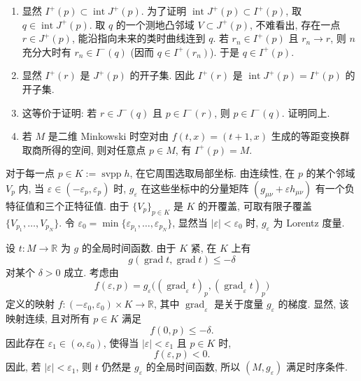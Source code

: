 \begin{description}[font=\normalfont,leftmargin=2em,labelwidth=1.5em]
\begin{enumerate}[label=(\alph*),ref=\alph*,leftmargin=*]
\begin{align*}
\end{align*}
所以, 对于充分小的正数 $s$, $\gamma(s,t)$ 为指向未来的类时曲线. 因此
\[
  q=\lim_{s\to0^+}\gamma(s,1)\in\overline{I^+(p)}.
\]
\item 显然 $I^+(p)\subset\operatorname{int}J^+(p)$. 为了证明 $\operatorname{int}J^+(p)\subset I^+(p)$, 取 $q\in\operatorname{int}J^+(p)$. 取 $q$ 的一个测地凸邻域 $V\subset J^+(p)$, 不难看出, 存在一点 $r\in J^+(p)$, 能沿指向未来的类时曲线连到 $q$. 若 $r_n\in I^+(p)$ 且 $r_n\to r$, 则 $n$ 充分大时有 $r_n\in I^-(q)$ (因而 $q\in I^+(r_n)$). 于是 $q\in I^+(p)$.
\item 显然 $I^+(r)$ 是 $J^+(p)$ 的开子集. 因此 $I^+(r)$ 是 $\operatorname{int}J^+(p)=I^+(p)$ 的开子集.
\item 这等价于证明: 若 $r\in J^-(q)$ 且 $p\in I^-(r)$, 则 $p\in I^-(q)$. 证明同上.
\item 若 $M$ 是二维 Minkowski 时空对由 $f(t,x)=(t+1,x)$ 生成的等距变换群取商所得的空间, 则对任意点 $p\in M$, 有 $I^+(p)=M$.
\end{enumerate}

对于每一点 $p\in K:=\operatorname{svpp}h$, 在它周围选取局部坐标. 由连续性, 在 $p$ 的某个邻域 $V_p$ 内, 当 $\varepsilon\in(-\varepsilon_p,\varepsilon_p)$ 时, $g_\varepsilon$ 在这些坐标中的分量矩阵 $(g_{\mu\nu}+\varepsilon h_{\mu\nu})$ 有一个负特征值和三个正特征值. 由于 $\{V_p\}_{p\in K}$ 是 $K$ 的开覆盖, 可取有限子覆盖 $\{V_{p_1},\ldots,V_{p_N}\}$. 令 $\varepsilon_0=\min\{\varepsilon_{p_1},\ldots,\varepsilon_{p_N}\}$, 显然当 $|\varepsilon|<\varepsilon_0$ 时, $g_\varepsilon$ 为 Lorentz 度量.

设 $t:M\to\mathbb{R}$ 为 $g$ 的全局时间函数. 由于 $K$ 紧, 在 $K$ 上有
\[
  g(\operatorname{grad}t,\operatorname{grad}t)\leq-\delta
\]
对某个 $\delta>0$ 成立. 考虑由
\[
  f(\varepsilon,p)=g_\varepsilon\bigl((\operatorname{grad}_\varepsilon t)_p,
                                    (\operatorname{grad}_\varepsilon t)_p\bigr)
\]
定义的映射 $f:(-\varepsilon_0,\varepsilon_0)\times K\to\mathbb{R}$, 其中 $\operatorname{grad}_\varepsilon$ 是关于度量 $g_\varepsilon$ 的梯度. 显然, 该映射连续, 且对所有 $p\in K$ 满足
\[
  f(0,p)\leq-\delta.
\]
因此存在 $\varepsilon_1\in(o,\varepsilon_0)$, 使得当 $|\varepsilon|<\varepsilon_1$ 且 $p\in K$ 时,
\[
  f(\varepsilon,p)<0.
\]
因此, 若 $|\varepsilon|<\varepsilon_1$, 则 $t$ 仍然是 $g_\varepsilon$ 的全局时间函数, 所以 $(M,g_\varepsilon)$ 满足时序条件.


\end{description}
